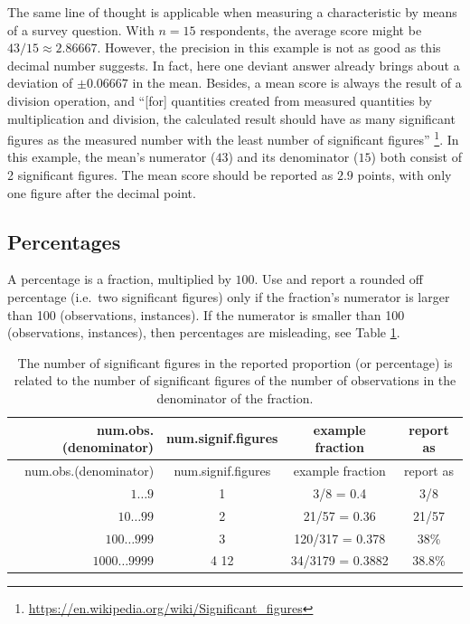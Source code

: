 \documentclass[
]{book}
\begin{document}
The same line of thought is applicable when measuring a characteristic
by means of a survey question. With \(n=15\) respondents, the average score
might be \(43/15 \approx 2.86667\). However, the precision
in this example is not as good as this decimal number suggests. In fact,
here one deviant answer already brings about a deviation of
\(\pm0.06667\) in the mean. Besides, a mean score
is always the result of a division operation, and
``{[}for{]} quantities created from measured quantities by multiplication and division, the calculated result should have as many significant figures as the measured number with the least number of significant figures'' \footnote{\url{https://en.wikipedia.org/wiki/Significant_figures}}.
In this example, the mean's numerator (\(43\)) and its denominator (\(15\)) both consist
of 2 significant figures. The mean score should be reported as \(2.9\) points, with only
one figure after the decimal point.

\hypertarget{percentages}{%
\subsection{Percentages}\label{percentages}}

A percentage is a fraction, multiplied by \(100\).
Use and report a rounded off percentage (i.e.~two significant
figures) only if the fraction's numerator is larger
than 100 (observations, instances). If the numerator is smaller than 100
(observations, instances), then percentages are misleading,
see Table \ref{tab:signiffigurepercentage}.

\begin{longtable}[]{@{}rccc@{}}
\caption{\label{tab:signiffigurepercentage} The number of significant figures in the reported
proportion (or percentage) is related to the number of significant figures of the number
of observations in the denominator of the fraction.}\tabularnewline
\toprule
num.obs.(denominator) & num.signif.figures & example fraction & report as \\
\midrule
\endfirsthead
\toprule
num.obs.(denominator) & num.signif.figures & example fraction & report as \\
\midrule
\endhead
\(1\dots9\) & 1 & 3/8 = 0.4 & 3/8 \\
\(10\dots99\) & 2 & 21/57 = 0.36 & 21/57 \\
\(100\dots999\) & 3 & 120/317 = 0.378 & 38\% \\
\(1000\dots9999\) & 4 12 & 34/3179 = 0.3882 & 38.8\% \\
\bottomrule
\end{longtable}
\end{document}
